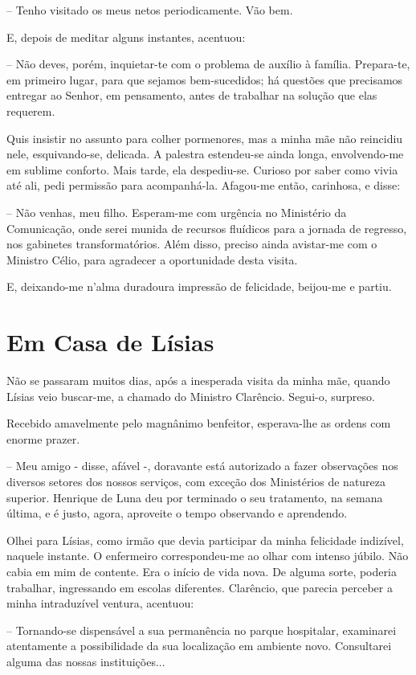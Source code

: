 \documentclass[portuguese,12pt,a4paper]{scrbook}
\begin{document}
	– Tenho visitado os meus netos periodicamente. Vão bem.
	
	E, depois de meditar alguns instantes, acentuou:
	
	– Não deves, porém, inquietar-te com o problema de auxílio à família. Prepara-te, em primeiro lugar, para que sejamos bem-sucedidos; há questões que precisamos entregar ao Senhor, em pensamento, antes de trabalhar na solução que elas requerem.
	
	Quis insistir no assunto para colher pormenores, mas a minha mãe não reincidiu nele, esquivando-se, delicada. A palestra estendeu-se ainda longa, envolvendo-me em sublime conforto. Mais tarde, ela despediu-se. Curioso por saber como vivia até ali, pedi permissão para acompanhá-la. Afagou-me então, carinhosa, e disse:
	
	– Não venhas, meu filho. Esperam-me com urgência no Ministério da Comunicação, onde serei munida de recursos fluídicos para a jornada de regresso, nos gabinetes transformatórios. Além disso, preciso ainda avistar-me com o Ministro Célio, para agradecer a oportunidade desta visita.
	
	
	E, deixando-me n'alma duradoura impressão de felicidade, beijou-me e partiu.
	
	
	\chapter{Em Casa de Lísias}
	
	Não se passaram muitos dias, após a inesperada visita da minha mãe, quando Lísias veio buscar-me, a chamado do Ministro Clarêncio. Segui-o, surpreso.
	
	Recebido amavelmente pelo magnânimo benfeitor, esperava-lhe as ordens com enorme prazer.
	
	– Meu amigo - disse, afável -, doravante está autorizado a fazer observações nos diversos setores dos nossos serviços, com exceção dos Ministérios de natureza superior. Henrique de Luna deu por terminado o seu tratamento, na semana última, e é justo, agora, aproveite o tempo observando e aprendendo.
	
	Olhei para Lísias, como irmão que devia participar da minha felicidade indizível, naquele instante. O enfermeiro correspondeu-me ao olhar com intenso júbilo. Não cabia em mim de contente. Era o início de vida nova. De alguma sorte, poderia trabalhar, ingressando em escolas diferentes. Clarêncio, que parecia perceber a minha intraduzível ventura, acentuou:
	
	– Tornando-se dispensável a sua permanência no parque hospitalar, examinarei atentamente a possibilidade da sua localização em ambiente novo. Consultarei alguma das nossas instituições...
	
\end{document}
